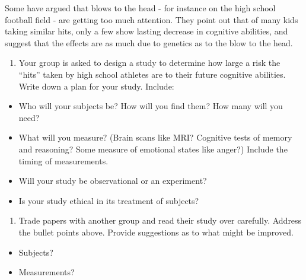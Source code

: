 \documentclass[
]{report}
\providecommand{\tightlist}{%
  \setlength{\itemsep}{0pt}\setlength{\parskip}{0pt}}
\begin{document}
Some have argued that blows to the head - for instance on the high school football field - are getting too much attention. They point out that of many kids taking similar hits, only a few show lasting decrease in cognitive abilities, and suggest that the effects are as much due to genetics as to the blow to the head.

\begin{enumerate}
\def\labelenumi{\arabic{enumi}.}
\tightlist
\item
  Your group is asked to design a study to determine how large a risk the ``hits''
  taken by high school athletes are to their future cognitive abilities. Write down
  a plan for your study. Include:
\end{enumerate}

\begin{itemize}
\item
  Who will your subjects be? How will you find them? How many will you need?
\item
  What will you measure? (Brain scans like MRI? Cognitive tests of memory and reasoning? Some measure of emotional states like anger?) Include the timing of measurements.
\item
  Will your study be observational or an experiment?
\item
  Is your study ethical in its treatment of subjects?
\end{itemize}

\vspace{1in}

\begin{enumerate}
\def\labelenumi{\arabic{enumi}.}
\setcounter{enumi}{1}
\tightlist
\item
  Trade papers with another group and read their study over carefully. Address the bullet points above. Provide suggestions as to what might be improved.
\end{enumerate}

\begin{itemize}
\tightlist
\item
  Subjects?
\end{itemize}

\vspace{0.5in}

\begin{itemize}
\tightlist
\item
  Measurements?
\end{itemize}

\vspace{0.5in}
\end{document}
